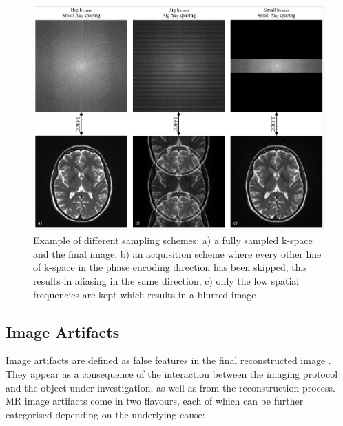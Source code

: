 \begin{figure}[ht]
    \centering
    \includegraphics[width=1\textwidth,keepaspectratio]{images/mri/fourierReconstructionPartial}
    \caption{Example of different sampling schemes: a) a fully sampled k-space and the final image, b) an acquisition scheme where every other line of k-space in the phase encoding direction has been skipped; this results in aliasing in the same direction, c) only the low spatial frequencies are kept which results in a blurred image}
    \label{fig:fourierReconstructionPartial}
\end{figure}

\hfill

\subsection{Image Artifacts}

Image artifacts are defined as false features in the final reconstructed image \cite{Haacke1999}. 
They appear as a consequence of the interaction between the imaging protocol and the object under investigation, as well as from the reconstruction process. 
MR image artifacts come in two flavours, each of which can be further categorised depending on the underlying cause:

\clearpage

